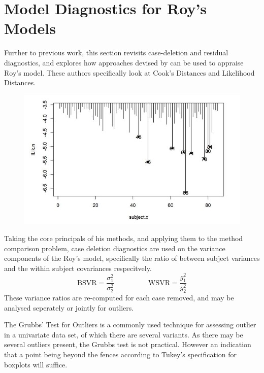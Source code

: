 \documentclass[12pt, a4paper]{report}
\theoremstyle{definition}
\theoremstyle{remark}
\begin{document}
	
	
	

\section{Model Diagnostics for Roy's Models}
	
Further to previous work, this section revisits case-deletion and residual diagnostics, and explores how approaches devised by \citet{Galecki} can be used to appraise Roy's model. These authors specifically look at Cook's Distances and Likelihood Distances.
	

	\begin{figure}[h!]
		\centering
		\includegraphics[width=0.7\linewidth]{images/LogLik-JS-Roy}
		\caption{}
		\label{fig:LogLik-JS-Roy}
	\end{figure}
	

Taking the core principals of his methods, and applying them to the method comparison problem, case deletion diagnostics are used on the variance components of the Roy's model, specifically the ratio of between subject variances and the within subject covariances respecitvely.
\[ \mbox{BSVR} = \frac{\sigma^2_1}{\sigma^2_2} \phantom{makespace}  \mbox{WSVR} = \frac{g^2_1}{g^2_2} \]
These variance ratios are re-computed for each case removed, and may be analysed seperately or jointly for outliers.
	
The Grubbs' Test for Outliers is a commonly used technique for assessing outlier in a univariate data set, of which there are several variants. As there may be several outliers present, the Grubbs test is not practical. However an indication that a point being beyond the fences according to Tukey's specification for boxplots will suffice.
	
\end{document}
